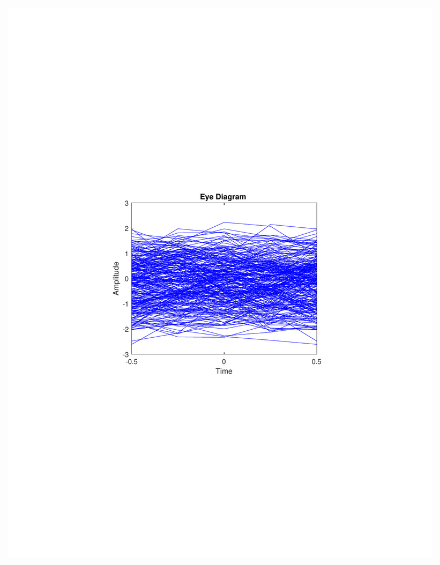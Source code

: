 \begin{refsection}
\begin{figure}[H]
\begin{minipage}{0.30\textwidth}
		\includegraphics[clip, trim=4cm 8cm 4cm 8cm, width=1\textwidth]{./sdf/m_qam_system/figures/expResults/intradyne/2_eye_16GBdInSig13dB_AfMF.pdf}
		\label{fig:16GBdSpecMF}
	\end{minipage}
	\begin{minipage}{0.30\textwidth}
		\centering

\end{minipage}
\end{figure}
\end{refsection}
